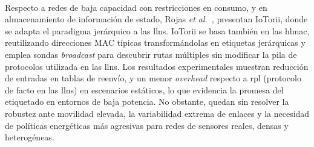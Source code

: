 \\
Respecto a redes de baja capacidad con restricciones en consumo, y en almacenamiento de información de estado, Rojas \textit{et al.}~\cite{rojas2021outperforming}, presentan IoTorii, donde se adapta el paradigma jerárquico a las \gls{llns}. IoTorii se basa también en las \gls{hlmac}, reutilizando direcciones MAC típicas transformándolas en etiquetas jerárquicas y emplea sondas \textit{broadcast} para descubrir rutas múltiples sin modificar la pila de protocolos utilizada en las \gls{llns}. Los resultados experimentales muestran reducción de entradas en tablas de reenvío, y un menor \textit{overhead} respecto a \gls{rpl} (protocolo de facto en las \gls{llns}) en escenarios estáticos, lo que evidencia la promesa del etiquetado en entornos de baja potencia. No obstante, quedan sin resolver la robustez ante movilidad elevada, la variabilidad extrema de enlaces y la necesidad de políticas energéticas más agresivas para redes de sensores reales, densas y heterogéneas.\\
\\
